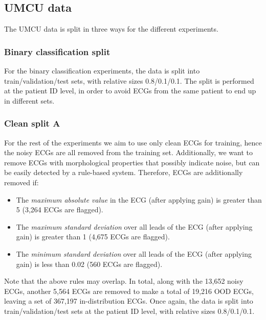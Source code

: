 \documentclass[a4paper,10pt]{article}
\begin{document}
\subsection{UMCU data}

The UMCU data is split in three ways for the different experiments.


\subsubsection{Binary classification split}
\label{sec:binary_split}

For the binary classification experiments, the data is split into train/validation/test sets, with relative sizes 0.8/0.1/0.1. The split is performed at the patient ID level, in order to avoid ECGs from the same patient to end up in different sets.


\subsubsection{Clean split A}
\label{sec:clean_split_a}

For the rest of the experiments we aim to use only clean ECGs for training, hence the noisy ECGs are all removed from the training set. Additionally, we want to remove ECGs with morphological properties that possibly indicate noise, but can be easily detected by a rule-based system. Therefore, ECGs are additionally removed if:
\begin{itemize}
	\item The \emph{maximum absolute value} in the ECG (after applying gain) is greater than 5 (3,264 ECGs are flagged).
	\item The \emph{maximum standard deviation} over all leads of the ECG (after applying gain) is greater than 1 (4,675 ECGs are flagged).
	\item The \emph{minimum standard deviation} over all leads of the ECG (after applying gain) is less than 0.02 (560 ECGs are flagged).
\end{itemize}
Note that the above rules may overlap. In total, along with the 13,652 noisy ECGs, another 5,564 ECGs are removed to make a total of 19,216 OOD ECGs, leaving a set of 367,197 in-distribution ECGs. Once again, the data is split into train/validation/test sets at the patient ID level, with relative sizes 0.8/0.1/0.1.
\end{document}
